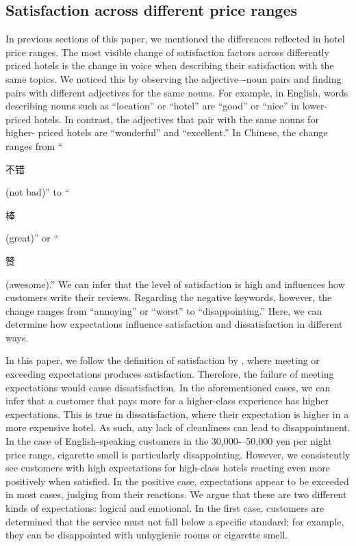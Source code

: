 \documentclass[smallextended,natbib]{svjour3}       %
\begin{document}
  \subsection{Satisfaction across different price ranges}\label{disc:price}

    In previous sections of this paper, we mentioned the differences reflected in hotel price ranges. The most visible change of satisfaction factors across differently priced hotels is the change in voice when describing their satisfaction with the same topics. We noticed this by observing the adjective–-noun pairs and finding pairs with different adjectives for the same nouns. For example, in English, words describing nouns such as ``location'' or ``hotel'' are ``good'' or ``nice'' in lower-priced hotels. In contrast, the adjectives that pair with the same nouns for higher- priced hotels are ``wonderful'' and ``excellent.'' In Chinese, the change ranges from ``\begin{CJK}{UTF8}{gbsn}不错\end{CJK} (not bad)'' to ``\begin{CJK}{UTF8}{gbsn}棒\end{CJK} (great)'' or ``\begin{CJK}{UTF8}{gbsn}赞\end{CJK} (awesome).'' We can infer that the level of satisfaction is high and influences how customers write their reviews. Regarding the negative keywords, however, the change ranges from ``annoying'' or ``worst'' to ``disappointing.'' Here, we can determine how expectations influence satisfaction and dissatisfaction in different ways. 

    In this paper, we follow the definition of satisfaction by \cite{hunt1975}, where meeting or exceeding expectations produces satisfaction. Therefore, the failure of meeting expectations would cause dissatisfaction. In the aforementioned cases, we can infer that a customer that pays more for a higher-class experience has higher expectations. This is true in dissatisfaction, where their expectation is higher in a more expensive hotel. As such, any lack of cleanliness can lead to disappointment. In the case of English-speaking customers in the 30,000-–50,000 yen per night price range, cigarette smell is particularly disappointing. However, we consistently see customers with high expectations for high-class hotels reacting even more positively when satisfied. In the positive case, expectations appear to be exceeded in most cases, judging from their reactions. We argue that these are two different kinds of expectations: logical and emotional. In the first case, customers are determined that the service must not fall below a specific standard; for example, they can be disappointed with unhygienic rooms or cigarette smell.
\end{document}
